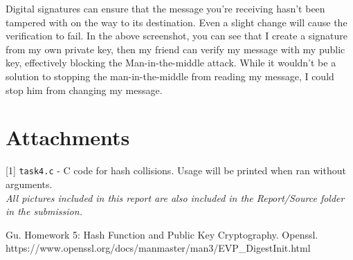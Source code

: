 \documentclass{article}
\begin{document}
Digital signatures can ensure that the message you're receiving hasn't been tampered with on the way to its destination.  Even a slight change will cause the verification to fail.  In the above screenshot, you can see that I create a signature from my own private key, then my friend can verify my message with my public key, effectively blocking the Man-in-the-middle attack.  While it wouldn't be a solution to stopping the man-in-the-middle from reading my message, I could stop him from changing my message.

\section{Attachments}
[1] \texttt{task4.c} - C code for hash collisions.  Usage will be printed when ran without arguments.\\

\textit{All pictures included in this report are also included in the Report/Source folder in the submission.}


\begin{thebibliography}{9}
Gu.
\textmd{Homework 5: Hash Function and Public Key Cryptography.}
Openssl. \textmd{https://www.openssl.org/docs/manmaster/man3/EVP\_DigestInit.html}
\end{thebibliography}
\end{document}
